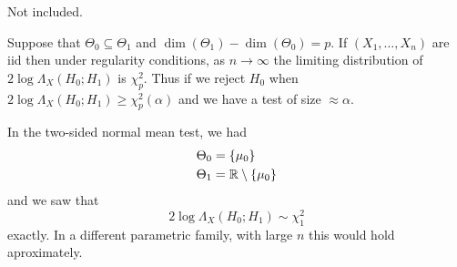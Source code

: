\documentclass{article}
\begin{document}
\pf Not included.
\begin{theorem}
  Suppose that $ \Theta_0\subseteq \Theta_1 $ and $ \dim(\Theta_1)-\dim(\Theta_0) = p $. If $ (X_1,\dots, X_n) $ are iid then under regularity conditions, as $ n\to\infty $ the limiting distribution of $ 2\log\Lambda_X(H_0;H_1) $ is $ \chi_p^2 $. Thus if we reject $ H_0 $ when $ 2\log\Lambda_X(H_0;H_1)\ge \chi_p^2(\alpha) $ and we have a test of size $ \approx \alpha $.
\end{theorem}
\begin{example}
  In the two-sided normal mean test, we had
  \begin{align*}
	  \Theta_0 &= \{\mu_0\}\\
	  \Theta_1 &= \mathbb{R}\setminus \{\mu_0\}
  \end{align*}
  and we saw that
  \[
    2\log\Lambda_X(H_0;H_1) \sim \chi_1^2
  \]
  exactly. In a different parametric family, with large $ n $ this would hold aproximately.
\end{example}
\end{document}
